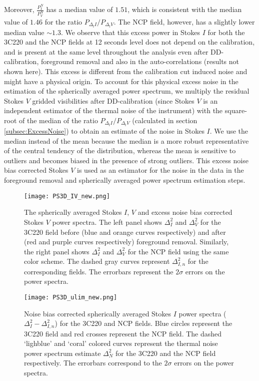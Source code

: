 \documentclass[fleqn,usenatbib]{mnras}
\begin{document}
Moreover, $\frac{P_{I}^N}{P_{V}^N}$ has a median value of $1.51$, which is consistent with the median value of $1.46$ for the ratio $P_{\Delta_t I} / P_{\Delta_t V}$. The NCP field, however, has a slightly lower median value $\sim 1.3$. We observe that this excess power in Stokes $I$ for both the 3C220 and the NCP fields at 12 seconds level does not depend on the calibration, and is present at the same level throughout the analysis even after DD-calibration, foreground removal and also in the auto-correlations (results not shown here). This excess is different from the calibration cut induced noise and might have a physical origin. To account for this physical excess noise in the estimation of the spherically averaged power spectrum, we multiply the residual Stokes $V$ gridded visibilities after DD-calibration (since Stokes $V$ is an independent estimator of the thermal noise of the instrument) with the square-root of the median of the ratio $P_{\Delta_t I} / P_{\Delta_t V}$ (calculated in section \ref{subsec:ExcessNoise}) to obtain an estimate of the noise in Stokes $I$. We use the median instead of the mean because the median is a more robust representative of the central tendency of the distribution, whereas the mean is sensitive to outliers and becomes biased in the presence of strong outliers. This excess noise bias corrected Stokes $V$ is used as an estimator for the noise in the data in the foreground removal and spherically averaged power spectrum estimation steps. 

\begin{figure*}
\centering
\texttt{[image: PS3D\_IV\_new.png]}
    \caption{The spherically averaged Stokes $I$, $V$ and excess noise bias corrected Stokes $V$ power spectra. The left panel shows $\Delta_{I}^2$ and $\Delta_{V}^2$ for the 3C220 field before (blue and orange curves respectively) and after (red and purple curves respectively) foreground removal. Similarly, the right panel shows $\Delta_{I}^2$ and $\Delta_{V}^2$ for the NCP field using the same color scheme. The dashed gray curves represent $\Delta_{I,n}^2$ for the corresponding fields. The errorbars represent the $2\sigma$ errors on the power spectra.} 
\label{fig:ps3d_IV}
\end{figure*} 
\begin{figure}
\centering
\texttt{[image: PS3D\_ulim\_new.png]}
    \caption{Noise bias corrected spherically averaged Stokes $I$ power spectra ($\Delta_I^2 - \Delta_{I,n}^2$) for the 3C220 and NCP fields. Blue circles represent the 3C220 field and red crosses represent the NCP field. The dashed `lighblue' and `coral' colored curves represent the thermal noise power spectrum estimate $\Delta_N^2$ for the 3C220 and the NCP field respectively. The errorbars correspond to the $2\sigma$ errors on the power spectra.} 
\label{fig:ps3d_ulim}
\end{figure} 
\end{document}
